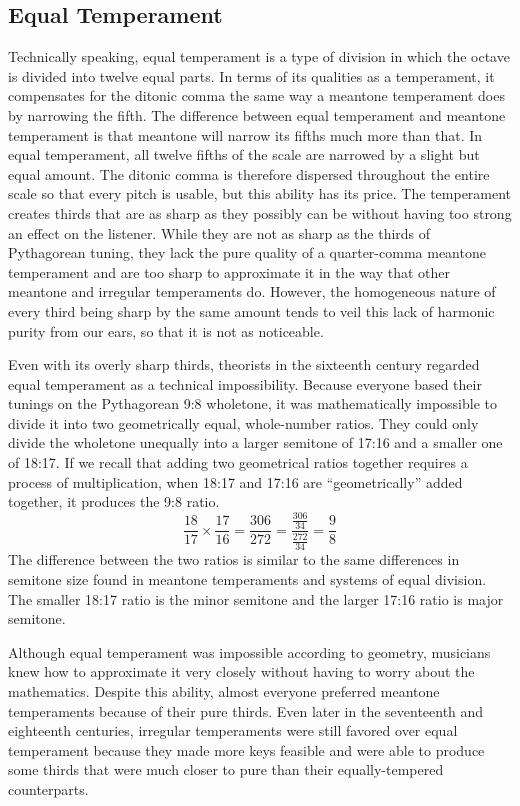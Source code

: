 \subsection{Equal Temperament}

Technically speaking, equal temperament is a type of division in which the octave is divided into twelve equal parts.
In terms of its qualities as a temperament, it compensates for the ditonic comma the same way a meantone temperament
does by narrowing the fifth. The difference between equal temperament and meantone temperament is that meantone will
narrow its fifths much more than that. In equal temperament, all twelve fifths of the scale are narrowed by a slight
but equal amount. The ditonic comma is therefore dispersed throughout the entire scale so that every pitch is usable,
but this ability has its price. The temperament creates thirds that are as sharp as they possibly can be without having
too strong an effect on the listener. While they are not as sharp as the thirds of Pythagorean tuning, they lack the
pure quality of a quarter-comma meantone temperament and are too sharp to approximate it in the way that other meantone
and irregular temperaments do. However, the homogeneous nature of every third being sharp by the same amount tends to
veil this lack of harmonic purity from our ears, so that it is not as noticeable.

Even with its overly sharp thirds, theorists in the sixteenth century regarded equal
temperament as a technical impossibility. Because everyone based their tunings on the
Pythagorean 9:8 wholetone, it was mathematically impossible to divide it into two
geometrically equal, whole-number ratios. They could only divide the wholetone
unequally into a larger semitone of 17:16 and a smaller one of 18:17.
\autocite[20]{ML:1} If we recall that adding two geometrical ratios together requires a
process of multiplication, when 18:17 and 17:16 are ``geometrically'' added
together, it produces the 9:8 ratio.
\begin{equation}
 \frac{18}{17} \times
 \frac{17}{16} =
 \frac{306}{272} =
 \frac{\frac{306}{34}}{\frac{272}{34}} =
 \frac{9}{8}
\end{equation}
The difference between the two ratios is similar to the same differences in semitone size
found in meantone temperaments and systems of equal division. The smaller 18:17 ratio is
the minor semitone and the larger 17:16 ratio is major semitone.

Although equal temperament was impossible according to geometry, musicians knew how to approximate it very closely
without having to worry about the mathematics. Despite this ability, almost everyone preferred meantone temperaments
because of their pure thirds. Even later in the seventeenth and eighteenth centuries, irregular temperaments were still
favored over equal temperament because they made more keys feasible and were able to produce some thirds that were much
closer to pure than their equally-tempered counterparts.

